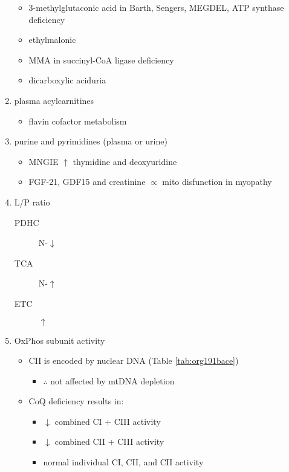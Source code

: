 \documentclass{scrartcl}
\begin{document}
\begin{enumerate}
\begin{itemize}
\begin{itemize}
\end{itemize}
\item 3-methylglutaconic acid in Barth, Sengers, MEGDEL, ATP synthase deficiency
\item ethylmalonic
\item MMA in succinyl-CoA ligase deficiency
\item dicarboxylic aciduria
\end{itemize}
\item plasma acylcarnitines
\label{sec:orgccbd16b}
\begin{itemize}
\item flavin cofactor metabolism
\end{itemize}
\item purine and pyrimidines (plasma or urine)
\label{sec:orgf6f8339}
\begin{itemize}
\item MNGIE \(\uparrow\) thymidine and deoxyuridine
\end{itemize}
\begin{itemize}
\item FGF-21, GDF15 and creatinine \(\propto\) mito disfunction in myopathy
\end{itemize}

\item L/P ratio
\label{sec:org5bc3e12}
\begin{description}
\item[{PDHC}] N-\(\downarrow\)
\item[{TCA}] N-\(\uparrow\)
\item[{ETC}] \(\uparrow\)
\end{description}
\item OxPhos subunit activity
\label{sec:org2f021b9}
\begin{itemize}
\item CII is encoded by nuclear DNA (Table \ref{tab:org191bace})
\begin{itemize}
\item \(\therefore\) not affected by mtDNA depletion
\end{itemize}
\item CoQ deficiency results in:
\begin{itemize}
\item \(\downarrow\) combined CI + CIII activity
\item \(\downarrow\) combined CII + CIII activity
\item normal individual CI, CII, and CII activity
\end{itemize}
\end{itemize}
\end{enumerate}
\end{document}

